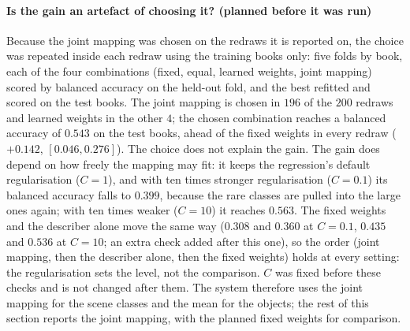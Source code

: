\paragraph{Is the gain an artefact of choosing it? (planned before it was run)} Because the joint mapping was chosen on the redraws it is reported on, the choice was repeated inside each redraw using the training books only: five folds by book, each of the four combinations (fixed, equal, learned weights, joint mapping) scored by balanced accuracy on the held-out fold, and the best refitted and scored on the test books. The joint mapping is chosen in $196$ of the $200$ redraws and learned weights in the other $4$; the chosen combination reaches a balanced accuracy of $0.543$ on the test books, ahead of the fixed weights in every redraw ($+0.142$, $[0.046, 0.276]$). The choice does not explain the gain. The gain does depend on how freely the mapping may fit: it keeps the regression's default regularisation ($C = 1$), and with ten times stronger regularisation ($C = 0.1$) its balanced accuracy falls to $0.399$, because the rare classes are pulled into the large ones again; with ten times weaker ($C = 10$) it reaches $0.563$. The fixed weights and the describer alone move the same way ($0.308$ and $0.360$ at $C = 0.1$, $0.435$ and $0.536$ at $C = 10$; an extra check added after this one), so the order (joint mapping, then the describer alone, then the fixed weights) holds at every setting: the regularisation sets the level, not the comparison. $C$ was fixed before these checks and is not changed after them. The system therefore uses the joint mapping for the scene classes and the mean for the objects; the rest of this section reports the joint mapping, with the planned fixed weights for comparison.

